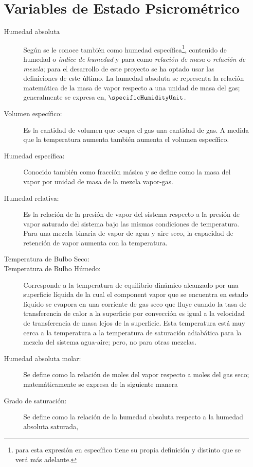 \section{Variables de Estado Psicrométrico}
    \begin{description}
        \item[Humedad absoluta] Según \parencite[p. 729]{bib:cengel2015termodinamica} se le conoce también como humedad específica\footnote{para \parencite{bib:green2007perry} esta expresión en específico tiene su propia definición y distinto que se verá más adelante.}, contenido de humedad o \textit{índice de humedad} y para \parencite[p. 12-4]{bib:green2007perry} como \textit{relación de masa} o \textit{relación de mezcla}; para el desarrollo de este proyecto se ha optado usar las definiciones de este último. La humedad absoluta se representa la relación matemática de la masa de vapor respecto a una unidad de masa del gas; generalmente se expresa en, $\specificHumidityUnit$.
        \eqAbsoluteHumidity*
        \item[Volumen específico:] Es la cantidad de volumen que ocupa el gas una cantidad de gas. A medida que la temperatura aumenta también aumenta el volumen específico.
        \item[Humedad específica:] Conocido también como fracción másica y se define como la masa del vapor por unidad de masa de la mezcla vapor-gas.
        \item[Humedad relativa:] Es la relación de la presión de vapor del sistema respecto a la presión de vapor saturado del sistema bajo las mismas condiciones de temperatura. Para una mezcla binaria de vapor de agua y aire seco, la capacidad de retención de vapor aumenta con la temperatura.
        \item[Temperatura de Bulbo Seco:]  
        \item[Temperatura de Bulbo Húmedo:] Corresponde a la temperatura de equilibrio dinámico alcanzado por una superficie líquida de la cual el component vapor que se encuentra en estado líquido se evapora en una corriente de gas seco que fluye cuando la tasa de transferencia de calor a la superficie por convección es igual a la velocidad de transferencia de masa lejos de la superficie. Esta temperatura está muy cerca a la temperatura a la temperatura de saturación adiabática para la mezcla del sistema agua-aire; pero, no para otras mezclas.
        \item[Humedad absoluta molar:] Se define como la relación de moles del vapor respecto a moles del gas seco; matemáticamente se expresa de la siguiente manera
        \item[Grado de saturación:] Se define como la relación de la humedad absoluta respecto a la humedad absoluta saturada,
        

\end{description}
